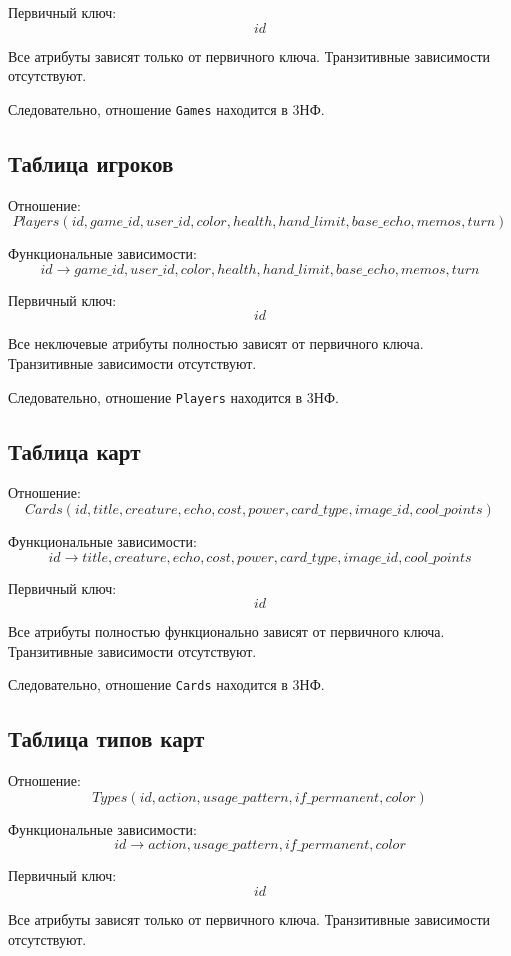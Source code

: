 Первичный ключ:
\[
id
\]

Все атрибуты зависят только от первичного ключа.
Транзитивные зависимости отсутствуют.

Следовательно, отношение \texttt{Games} находится в 3НФ.

\subsection{Таблица игроков}

Отношение:
\[
Players(
id,
game\_id,
user\_id,
color,
health,
hand\_limit,
base\_echo,
memos,
turn
)
\]

Функциональные зависимости:
\[
id \rightarrow game\_id,
user\_id,
color,
health,
hand\_limit,
base\_echo,
memos,
turn
\]

Первичный ключ:
\[
id
\]

Все неключевые атрибуты полностью зависят от первичного ключа.
Транзитивные зависимости отсутствуют.

Следовательно, отношение \texttt{Players} находится в 3НФ.

\subsection{Таблица карт}

Отношение:
\[
Cards(
id,
title,
creature,
echo,
cost,
power,
card\_type,
image\_id,
cool\_points
)
\]

Функциональные зависимости:
\[
id \rightarrow title,
creature,
echo,
cost,
power,
card\_type,
image\_id,
cool\_points
\]

Первичный ключ:
\[
id
\]

Все атрибуты полностью функционально зависят от первичного ключа.
Транзитивные зависимости отсутствуют.

Следовательно, отношение \texttt{Cards} находится в 3НФ.

\subsection{Таблица типов карт}

Отношение:
\[
Types(
id,
action,
usage\_pattern,
if\_permanent,
color
)
\]

Функциональные зависимости:
\[
id \rightarrow action,
usage\_pattern,
if\_permanent,
color
\]

Первичный ключ:
\[
id
\]

Все атрибуты зависят только от первичного ключа.
Транзитивные зависимости отсутствуют.

